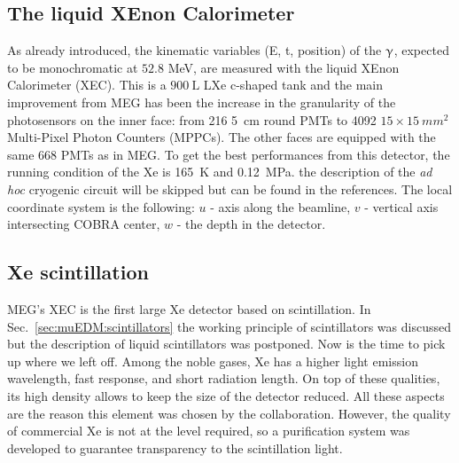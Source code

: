 \begin{refsection}
\section{The liquid XEnon Calorimeter}
    \label{sec:MEG:XEC}
    As already introduced, the kinematic variables (E, t, position) of the $\upgamma$, expected to be monochromatic at $52.8$ MeV, are measured with the liquid XEnon Calorimeter (XEC).
    This is a $\SI{900}{\liter}$ LXe c-shaped tank and the main improvement from MEG has been the increase in the granularity of the photosensors on the inner face: from 216 \SI{5}{cm} round PMTs to 4092 $15\times\SI{15}{mm^2}$ Multi-Pixel Photon Counters (MPPCs). 
    The other faces are equipped with the same 668 PMTs as in MEG.
    To get the best performances from this detector, the running condition of the Xe is \SI{165}{\kelvin} and \SI{0.12}{MPa}. the description of the \textit{ad hoc} cryogenic circuit will be skipped but can be found in the references.
    The local coordinate system is the following: $u$ - axis along the beamline, $v$ - vertical axis intersecting COBRA center, $w$ - the depth in the detector.
    

    \subsection{Xe scintillation}
        MEG's XEC is the first large Xe detector based on scintillation.
        In Sec.~\ref{sec:muEDM:scintillators} the working principle of scintillators was discussed but the description of liquid scintillators was postponed. 
        Now is the time to pick up where we left off.
        Among the noble gases, Xe has a higher light emission wavelength, fast response, and short radiation length.
        On top of these qualities, its high density allows to keep the size of the detector reduced.
        All these aspects are the reason this element was chosen by the collaboration.
        However, the quality of commercial Xe is not at the level required, so a purification system was developed to guarantee transparency to the scintillation light.\\
        

\end{refsection}

